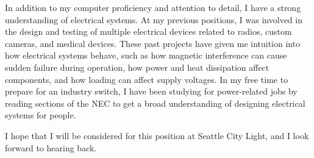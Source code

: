 \documentclass[11pt, a4paper]{awesome-cv}
\begin{document}
\begin{cvletter}
  \tab In addition to my computer proficiency and attention to detail, I have a strong understanding of electrical
  systems.
  At my previous positions, I was involved in the design and testing of multiple electrical devices related to radios,
  custom cameras, and medical devices.
  These past projects have given me intuition into how electrical systems behave,
  such as how magnetic interference can cause sudden failure during operation, how power and heat
  dissipation affect components, and how loading can affect supply voltages.
  In my free time to prepare for an industry switch, I have been studying for power-related jobs by
  reading sections of the NEC to get a broad understanding of designing electrical systems for
  people.

  \tab I hope that I will be considered for this position at Seattle City Light, and I look forward to hearing back.

\end{cvletter}

\makeletterclosing
\end{document}
